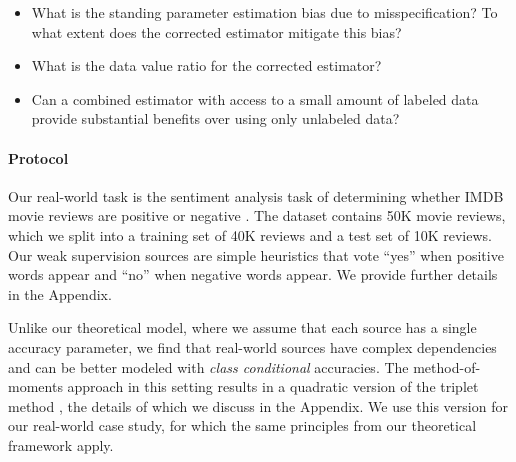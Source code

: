 \begin{itemize}
    \item What is the standing parameter estimation bias due to misspecification? To what extent does the corrected estimator mitigate this bias?
    
    \item What is the data value ratio for the corrected estimator? %
    
    \item Can a combined estimator with access to a small amount of labeled data provide substantial benefits over using only unlabeled data?
\end{itemize}
\vspace{-0.5em}

\paragraph{Protocol} Our real-world task is the sentiment analysis task of determining whether IMDB movie reviews are positive or negative \citep{maas2011learning}. The dataset contains 50K movie reviews, which we split into a training set of 40K reviews and a test set of 10K reviews. Our weak supervision sources are simple heuristics that vote ``yes'' when positive words appear and ``no'' when negative words appear. We provide further details in the Appendix.


Unlike our theoretical model, where we assume that each source has a single accuracy parameter, we find that real-world sources have complex dependencies and can be better modeled with \textit{class conditional} accuracies. The method-of-moments approach in this setting results in a quadratic version of the triplet method \citep{fu2020fast}, the details of which we discuss in the Appendix. We use this version for our real-world case study, for which the same principles from our theoretical framework apply.


